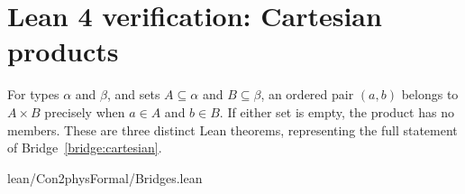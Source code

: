 \section{Lean 4 verification: Cartesian products}
\label{sec:lean-bridge-03}
For types $\alpha$ and $\beta$, and sets $A\subseteq\alpha$ and
$B\subseteq\beta$, an ordered pair $(a,b)$ belongs to $A\times B$
precisely when $a\in A$ and $b\in B$. If either set is empty,
the product has no members. These are three distinct Lean theorems,
representing the full statement of Bridge~\ref{bridge:cartesian}.


{lean/Con2physFormal/Bridges.lean}

